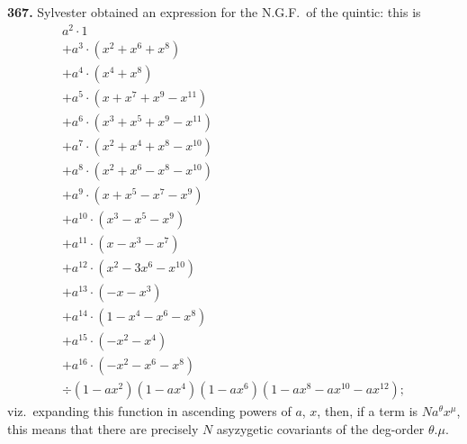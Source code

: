 \documentclass[12pt,a4paper]{article}
\begin{document}
\newpage
\noindent\textbf{367.} Sylvester obtained an expression for the N.G.F.\ of the quintic: this is
\begin{multline*}
a^2 \cdot 1\\
+ a^3 \cdot (x^2 + x^6 + x^8)\\
+ a^4 \cdot (x^4 + x^8)\\
+ a^5 \cdot (x + x^7 + x^9 - x^{11})\\
+ a^6 \cdot (x^3 + x^5 + x^9 - x^{11})\\
+ a^7 \cdot (x^2 + x^4 + x^8 - x^{10})\\
+ a^8 \cdot (x^2 + x^6 - x^8 - x^{10})\\
+ a^9 \cdot (x + x^5 - x^7 - x^9)\\
+ a^{10} \cdot (x^3 - x^5 - x^9)\\
+ a^{11} \cdot (x - x^3 - x^7)\\
+ a^{12} \cdot (x^2 - 3x^6 - x^{10})\\
+ a^{13} \cdot (-x - x^3)\\
+ a^{14} \cdot (1 - x^4 - x^6 - x^8)\\
+ a^{15} \cdot (-x^2 - x^4)\\
+ a^{16} \cdot (-x^2 - x^6 - x^8) \\
\div (1 - ax^2)(1 - ax^4)(1 - ax^6)(1 - ax^8 - ax^{10} - ax^{12});
\end{multline*}
viz.\ expanding this function in ascending powers of $a$, $x$, then, if a term is $Na^\theta x^\mu$, this means that there are precisely $N$ asyzygetic covariants of the deg-order $\theta.\mu$.

\medskip
\end{document}
